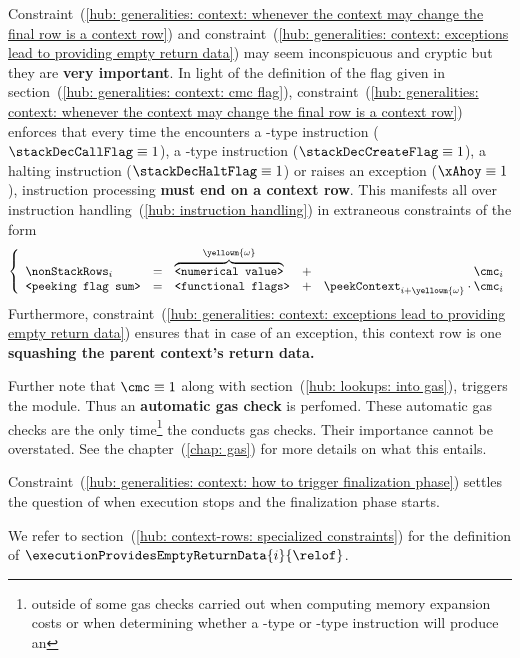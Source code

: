 \saNote{} \label{hub: generalities: context: consequences of CMC and XAHOY}
Constraint~(\ref{hub: generalities: context: whenever the context may change the final row is a context row}) and
constraint~(\ref{hub: generalities: context: exceptions lead to providing empty return data})
may seem inconspicuous and cryptic but they are \textbf{very important}.
In light of the definition of the \CONTEXTMAYCHANGE{} flag given in section~(\ref{hub: generalities: context: cmc flag}),
constraint~(\ref{hub: generalities: context: whenever the context may change the final row is a context row})
enforces that every time the \zkEvm{} encounters
a -type instruction ($\stackDecCallFlag \equiv 1$),
a -type instruction ($\stackDecCreateFlag \equiv 1$),
a halting instruction ($\stackDecHaltFlag \equiv 1$) or
raises an exception ($\xAhoy \equiv 1$),
instruction processing \textbf{must end on a context row}.
This manifests all over instruction handling~(\ref{hub: instruction handling})
in extraneous constraints of the form
\[
	\left\{ \begin{array}{lclcr}
		\nonStackRows _{i}          & = & \overbrace{\texttt{<numerical value>}}^{\yellowm{\omega}} & + & \cmc_{i}                                           \\
		\texttt{<peeking flag sum>} & = & \texttt{<functional flags>}                              & + & \peekContext_{i + \yellowm{\omega}} \cdot \cmc_{i} \\
	\end{array} \right.
\]
Furthermore,
constraint~(\ref{hub: generalities: context: exceptions lead to providing empty return data})
ensures that in case of an exception, this context row is one \textbf{squashing the parent context's return data.}

\saNote{} \label{hub: generalities: context: automatic gas checks}
Further note that $\cmc \equiv 1$ along with section~(\ref{hub: lookups: into gas}), triggers the \gasMod{} module.
Thus an \textbf{automatic gas check} is perfomed.
These automatic gas checks are the only time\footnote{outside of some gas checks carried out when computing memory expansion costs or when determining whether a -type or -type instruction will produce an \oogxSH{}} the \zkEvm{} conducts gas checks.
Their importance cannot be overstated.
See the \gasMod{} chapter~(\ref{chap: gas}) for more details on what this entails.

\saNote{} Constraint~(\ref{hub: generalities: context: how to trigger finalization phase}) settles the question of when execution stops and the finalization phase starts.

\saNote{} We refer to section~(\ref{hub: context-rows: specialized constraints}) for the definition of $\executionProvidesEmptyReturnData {i}{\relof}$.
